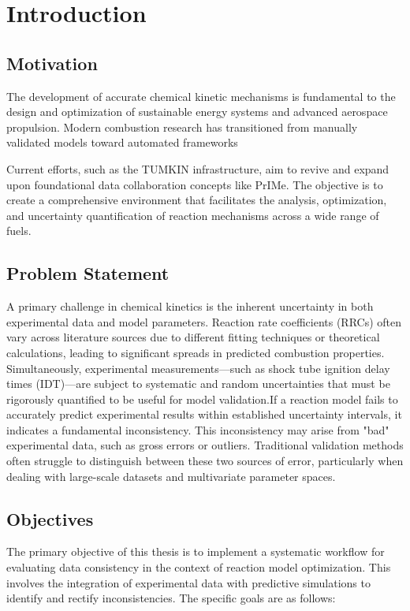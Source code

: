 \chapter{Introduction}\label{Chap:Introduction}




\section{Motivation}
The development of accurate chemical kinetic mechanisms is fundamental to the design and optimization of sustainable energy systems and advanced aerospace propulsion. Modern combustion research has transitioned from manually validated models toward automated frameworks

Current efforts, such as the TUMKIN infrastructure, aim to revive and expand upon foundational data collaboration concepts like PrIMe. The objective is to create a comprehensive environment that facilitates the analysis, optimization, and uncertainty quantification of reaction mechanisms across a wide range of fuels.



\section{Problem Statement}
A primary challenge in chemical kinetics is the inherent uncertainty in both experimental data and model parameters. Reaction rate coefficients (RRCs) often vary across literature sources due to different fitting techniques or theoretical calculations, leading to significant spreads in predicted combustion properties. Simultaneously, experimental measurements—such as shock tube ignition delay times (IDT)—are subject to systematic and random uncertainties that must be rigorously quantified to be useful for model validation.If a reaction model fails to accurately predict experimental results within established uncertainty intervals, it indicates a fundamental inconsistency. This inconsistency may arise from "bad" experimental data, such as gross errors or outliers. Traditional validation methods often struggle to distinguish between these two sources of error, particularly when dealing with large-scale datasets and multivariate parameter spaces.

\section{Objectives}
The primary objective of this thesis is to implement a systematic workflow for evaluating data consistency in the context of reaction model optimization. This involves the integration of experimental data with predictive simulations to identify and rectify inconsistencies. The specific goals are as follows:

